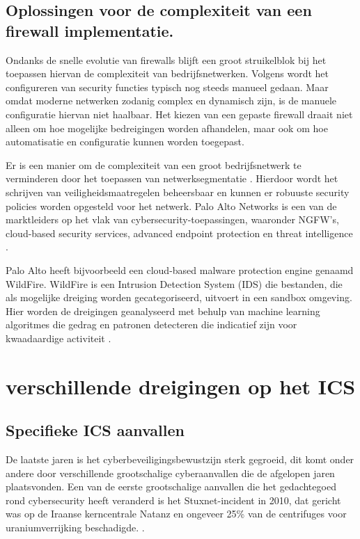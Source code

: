 \subsection{Oplossingen voor de complexiteit van een firewall implementatie.}

Ondanks de snelle evolutie van firewalls blijft een groot struikelblok bij het toepassen hiervan de complexiteit van bedrijfsnetwerken. Volgens \textcite{Bringhenti2023} wordt het configureren van security functies typisch nog steeds manueel gedaan. Maar omdat moderne netwerken zodanig complex en dynamisch zijn, is de manuele configuratie hiervan niet haalbaar. Het kiezen van een gepaste firewall draait niet alleen om hoe mogelijke bedreigingen worden afhandelen, maar ook om hoe automatisatie en configuratie kunnen worden toegepast.

Er is een manier om de complexiteit van een groot bedrijfsnetwerk te verminderen door het toepassen van netwerksegmentatie \autocite{Bringhenti2023}. Hierdoor wordt het schrijven van veiligheidsmaatregelen beheersbaar en kunnen er robuuste security policies worden opgesteld voor het netwerk. Palo Alto Networks is een van de marktleiders op het vlak van cybersecurity-toepassingen, waaronder NGFW’s, cloud-based security services, advanced endpoint protection en threat intelligence \autocite{TechnicalWhitepaper2014}.

Palo Alto heeft bijvoorbeeld een cloud-based malware protection engine genaamd WildFire. WildFire is een Intrusion Detection System (IDS) die bestanden, die als mogelijke dreiging worden gecategoriseerd, uitvoert in een sandbox omgeving. Hier worden de dreigingen geanalyseerd met behulp van machine learning algoritmes die gedrag en patronen detecteren die indicatief zijn voor kwaadaardige activiteit \autocite{PaloAltoWF2024}.




\section{verschillende dreigingen op het ICS}

\subsection{Specifieke ICS aanvallen}

De laatste jaren is het cyberbeveiligingsbewustzijn sterk gegroeid, dit komt onder andere door verschillende grootschalige cyberaanvallen die de afgelopen jaren plaatsvonden. Een van de eerste grootschalige aanvallen die het gedachtegoed rond cybersecurity heeft veranderd is het Stuxnet-incident in 2010, dat gericht was op de Iraanse kerncentrale Natanz en ongeveer 25\% van de centrifuges voor uraniumverrijking beschadigde. \autocite{Zetter2014}. 

